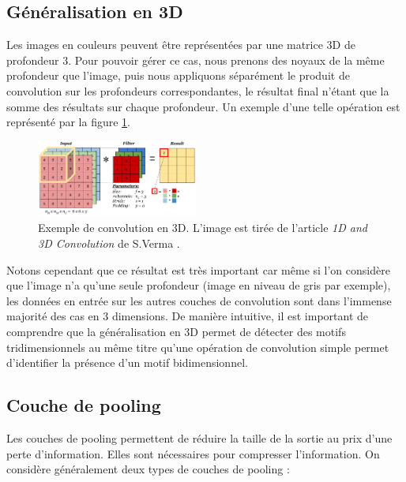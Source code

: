 \subsection{Généralisation en 3D}

Les images en couleurs peuvent être représentées par une matrice 3D de profondeur 3. Pour pouvoir gérer ce cas, nous prenons des noyaux de la même profondeur que l'image, puis nous appliquons séparément le produit de convolution sur les profondeurs correspondantes, le résultat final n'étant que la somme des résultats sur chaque profondeur. Un exemple d'une telle opération est représenté par la figure \ref{CNN_3D}.

\begin{figure}[!h]
\centering
\includegraphics[width=150pt]{images/cnn/CNN_3D.png}
\caption{Exemple de convolution en 3D. L'image est tirée de l'article \textit{1D and 3D Convolution} de S.Verma \cite{verma_understanding_2020}.}
\label{CNN_3D}
\end{figure}

Notons cependant que ce résultat est très important car même si l'on considère que l'image n'a qu'une seule profondeur (image en niveau de gris par exemple), les données en entrée sur les autres couches de convolution sont dans l'immense majorité des cas en 3 dimensions. De manière intuitive, il est important de comprendre que la généralisation en 3D permet de détecter des motifs tridimensionnels au même titre qu'une opération de convolution simple permet d'identifier la présence d'un motif bidimensionnel. 

\subsection{Couche de pooling}

Les couches de pooling permettent de réduire la taille de la sortie au prix d'une perte d'information. Elles sont nécessaires pour compresser l'information. On considère généralement deux types de couches de pooling :

